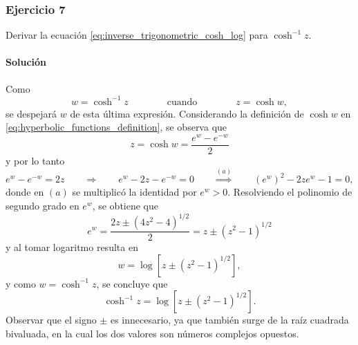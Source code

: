 \documentclass[a4paper]{report}
\begin{document}
\subsubsection{Ejercicio 7}

Derivar la ecuación \ref{eq:inverse_trigonometric_cosh_log} para \(\cosh^{-1}z\).

\paragraph{Solución} Como
\[
 w=\cosh^{-1}z
 \qquad\qquad\textrm{cuando}\qquad\qquad
 z=\cosh w,
\]
se despejará \(w\) de esta última expresión. Considerando la definición de \(\cosh w\) en  \ref{eq:hyperbolic_functions_definition}, se observa que 
\[
 z=\cosh w=\dfrac{e^w-e^{-w}}{2}
\]
y por lo tanto
\[
 e^w-e^{-w}=2z
 \qquad\Rightarrow\qquad 
 e^w-2z-e^{-w}=0
 \qquad\overset{(a)}{\Rightarrow}\qquad 
 (e^w)^2-2ze^w-1=0,
\]
donde en \((a)\) se multiplicó la identidad por \(e^w>0\). Resolviendo el polinomio de segundo grado en \(e^w\), se obtiene que 
\[
 e^w=\frac{2z\pm(4z^2-4)^{1/2}}{2}=z\pm(z^2-1)^{1/2}
\]
y al tomar logaritmo resulta en 
\[
 w=\log\left[z\pm(z^2-1)^{1/2}\right],
\]
y como \(w=\cosh^{-1}z\), se concluye que 
\[
 \cosh^{-1}z=\log\left[z\pm(z^2-1)^{1/2}\right].
\]
Observar que el signo \(\pm\) es innecesario, ya que también surge de la raíz cuadrada bivaluada, en la cual los dos valores son números complejos opuestos. 






















\end{document}
